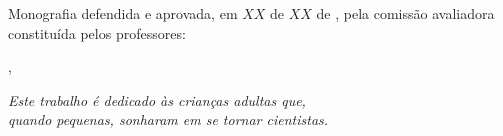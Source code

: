 \documentclass[
	12pt,				%
	openright,			%
	twoside,			%
	a4paper,			%
	english,			%
	brazil				%
	]{abntex2ufop} %
\begin{document}

%
% 
%
\begin{folhadeaprovacao}
% 
   Monografia defendida e aprovada, em $XX$ de $XX$ de \imprimirdata, pela comiss{\~a}o avaliadora constitu{\'i}da pelos professores:
   \vspace*{\fill}
   \vspace*{\fill}
   \vspace*{\fill}
   \vspace*{\fill}
      
   \begin{center}
    \vspace*{0.5cm}
    {\large\imprimirlocal}, {\large\imprimirdata}
    \vspace*{1cm}
  \end{center}
  
\end{folhadeaprovacao}

\begin{dedicatoria}
   \vspace*{\fill}
   \flushright
   \noindent
   \textit{ Este trabalho é dedicado às crianças adultas que,\\
   quando pequenas, sonharam em se tornar cientistas.} \vspace*{\fill}
\end{dedicatoria}
\end{document}
